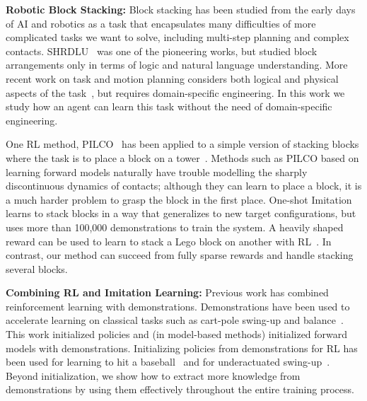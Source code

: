 \textbf{Robotic Block Stacking:} Block stacking has been studied from the early days of AI and robotics as a task that encapsulates many difficulties of more complicated tasks we want to solve, including multi-step planning and complex contacts. SHRDLU~\citep{winograd72shrdlr} was one of the pioneering works, but studied block arrangements only in terms of logic and natural language understanding. More recent work on task and motion planning considers both logical and physical aspects of the task~\citep{Kaelbling2011, Kavraki1996, srivastava14tamp}, but requires domain-specific engineering. In this work we study how an agent can learn this task without the need of domain-specific engineering.

One RL method, PILCO~\citep{deisenroth2011pilco} has been applied to a simple version of stacking blocks where the task is to place a block on a tower~\citep{deisenroth2011blocks}. Methods such as PILCO based on learning forward models naturally have trouble modelling the sharply discontinuous dynamics of contacts; although they can learn to place a block, it is a much harder problem to grasp the block in the first place.  One-shot Imitation~\citep{duan2017oneshotimitation} learns to stack blocks in a way that generalizes to new target configurations, but uses more than 100,000 demonstrations to train the system. A heavily shaped reward can be used to learn to stack a Lego block on another with RL~\citep{popov17stacking}. In contrast, our method can succeed from fully sparse rewards and handle stacking several blocks.

\textbf{Combining RL and Imitation Learning:} 
Previous work has combined reinforcement learning with demonstrations. Demonstrations have been used to accelerate learning on classical tasks such as cart-pole swing-up and balance~\citep{schaal97lfd}. This work initialized policies and (in model-based methods) initialized forward models with demonstrations. Initializing policies from demonstrations for RL has been used for learning to hit a baseball~\citep{peters2008baseball} and for underactuated swing-up~\citep{kober2008mp}. Beyond initialization, we show how to extract more knowledge from demonstrations by using them effectively throughout the entire training process.

